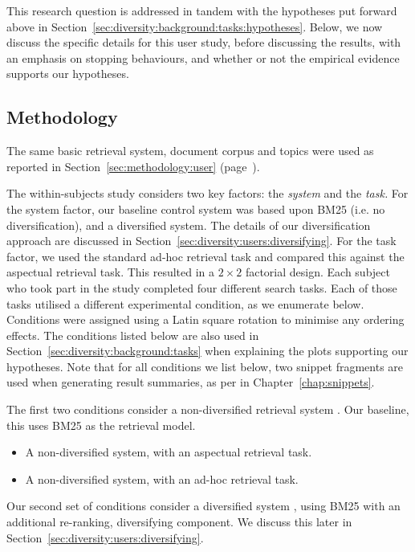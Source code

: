 This research question is addressed in tandem with the hypotheses put forward above in Section~\ref{sec:diversity:background:tasks:hypotheses}. Below, we now discuss the specific details for this user study, before discussing the results, with an emphasis on stopping behaviours, and whether or not the empirical evidence supports our hypotheses.

\subsection{Methodology}\label{sec:diversity:users:method}
The same basic retrieval system, document corpus and topics were used as reported in Section~\ref{sec:methodology:user} (page~\pageref{sec:methodology:user}).

The within-subjects study considers two key factors: the \emph{system} and the \emph{task.} For the system factor, our baseline control system was based upon BM25 (i.e. no diversification), and a diversified system. The details of our diversification approach are discussed in Section~\ref{sec:diversity:users:diversifying}. For the task factor, we used the standard ad-hoc retrieval task and compared this against the aspectual retrieval task. This resulted in a $2\times2$ factorial design. Each subject who took part in the study completed four different search tasks. Each of those tasks utilised a different experimental condition, as we enumerate below. Conditions were assigned using a Latin square rotation to minimise any ordering effects. The conditions listed below are also used in Section~\ref{sec:diversity:background:tasks} when explaining the plots supporting our hypotheses. Note that for all conditions we list below, two snippet fragments are used when generating result summaries, as per  in Chapter~\ref{chap:snippets}.

The first two conditions consider a non-diversified retrieval system . Our baseline, this uses BM25 as the retrieval model.

\begin{itemize}
    \item{ A non-diversified system, with an aspectual retrieval task.}
    \item{ A non-diversified system, with an ad-hoc retrieval task.}
\end{itemize}

Our second set of conditions consider a diversified system , using BM25 with an additional re-ranking, diversifying component. We discuss this later in Section~\ref{sec:diversity:users:diversifying}.


